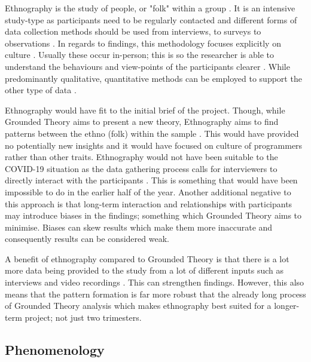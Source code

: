 Ethnography is the study of people, or "folk" within a group \cite{ethno}. It is an intensive study-type as participants need to be regularly contacted and different forms of data collection methods should be used from interviews, to surveys to observations \cite{ethno}. In regards to findings, this methodology focuses explicitly on culture \cite{ethno}. Usually these occur in-person; this is so the researcher is able to understand the behaviours and view-points of the participants clearer \cite{ethno}.  While predominantly qualitative, quantitative methods can be employed to support the other type of data \cite{ethno}. 
\newline
\par 
Ethnography would have fit to the initial brief of the project. Though, while Grounded Theory aims to present a new theory, Ethnography aims to find patterns between the ethno (folk) within the sample \cite{ethno}. This would have provided no potentially new insights and it would have focused on culture of programmers rather than other traits. Ethnography would not have been suitable to the COVID-19 situation as the data gathering process calls for interviewers to directly interact with the participants \cite{ethno}. This is something that would have been impossible to do in the earlier half of the year. Another additional negative to this approach is that long-term interaction and relationships with participants may introduce biases in the findings; something which Grounded Theory aims to minimise. Biases can skew results which make them more inaccurate and consequently results can be considered weak. 
 \newline
 \par
 A benefit of ethnography compared to Grounded Theory is that there is a lot more data being provided to the study from a lot of different inputs such as interviews and video recordings \cite{ethno}. This can strengthen findings. However, this also means that the pattern formation is far more robust that the already long process of Grounded Theory analysis which makes ethnography best suited for a longer-term project; not just two trimesters. 

\subsection{Phenomenology}


